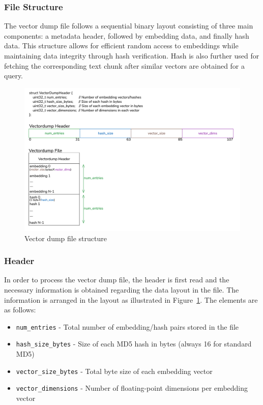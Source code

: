 \subsubsection{File Structure}
\label{subsec:Vectordump_FileStructure}
The vector dump file follows a sequential binary layout consisting of three main components: a metadata header, followed by embedding data, and finally hash data. This structure allows for efficient random access to embeddings while maintaining data integrity through hash verification. Hash is also further used for fetching the corresponding text chunk after similar vectors are obtained for a query.

   \begin{figure}[H]
    \centering
    \includegraphics[width=1.0\linewidth]{images/VectorDumpFiles.png}
    \caption{Vector dump file structure}
    \label{fig:vectordumpfilestructure}
\end{figure}

\subsubsection{Header}
\label{subsec:Vectordump_Header}
In order to process the vector dump file, the header is first read and the necessary information is obtained regarding the data layout in the file. The information is arranged in the layout as illustrated in Figure~\ref{fig:vectordumpfilestructure}. The elements are as follows:
\begin{itemize}
    \item \texttt{num\_entries} - Total number of embedding/hash pairs stored in the file
    \item \texttt{hash\_size\_bytes} - Size of each MD5 hash in bytes (always 16 for standard MD5)
    \item \texttt{vector\_size\_bytes} - Total byte size of each embedding vector
    \item \texttt{vector\_dimensions} - Number of floating-point dimensions per embedding vector
\end{itemize}

